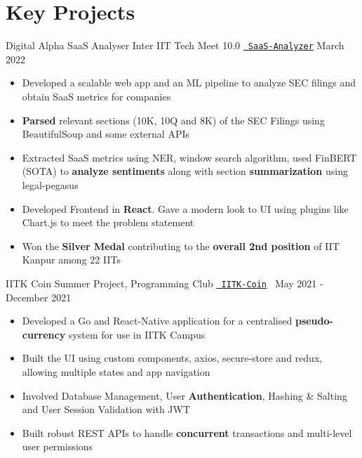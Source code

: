 \section*{\sc Key Projects}
\vspace{-2mm}
\hrulefill
\vspace{1mm}

\cventry
{Digital Alpha SaaS Analyser}
{Inter IIT Tech Meet 10.0}
{\texttt{\href{https://docs.google.com/presentation/d/1zgRrYwIt0juemg0FGrPXUjsLX2gD7f9wmv1iU7j4Gxo/edit?usp=sharing}{\faLink{} SaaS-Analyzer}}}
{March 2022}
{
\begin{itemize}
  \item Developed a scalable web app and an ML pipeline to analyze SEC filings and obtain SaaS metrics for companies
  \item \textbf{Parsed} relevant sections (10K, 10Q and 8K) of the SEC Filings using BeautifulSoup and some external APIs
  \item Extracted SaaS metrics using NER, window search algorithm, used FinBERT (SOTA) to \textbf{analyze sentiments} along with section \textbf{summarization} using legal-pegasus
  \item Developed Frontend in \textbf{React}. Gave a modern look to UI using plugins like Chart.js to meet the problem statement
  \item Won the \textbf{Silver Medal} contributing to the \textbf{overall 2nd position} of IIT Kanpur among 22 IITs
\end{itemize}
  }
\cventry
  {IITK Coin}
  {Summer Project, Programming Club}
  {\texttt{\href{https://github.com/abhishekshree/iitk-coin}{\faGithub{}}} \texttt{\href{https://github.com/abhishekshree/iitk-coin-native-app}{\faGithub{} IITK-Coin} }}
  {May 2021 - December 2021}
  {
    \begin{itemize}
      \item Developed a Go and React‑Native application for a centralised \textbf{pseudo-currency} system for use in IITK Campus
      \item Built the UI using custom components, axios, secure-store and redux, allowing multiple states and app navigation
      \item Involved Database Management, User \textbf{Authentication}, Hashing \& Salting and User Session Validation with JWT
      \item Built robust REST APIs to handle \textbf{concurrent} transactions and multi-level user permissions
    \end{itemize}
  }
